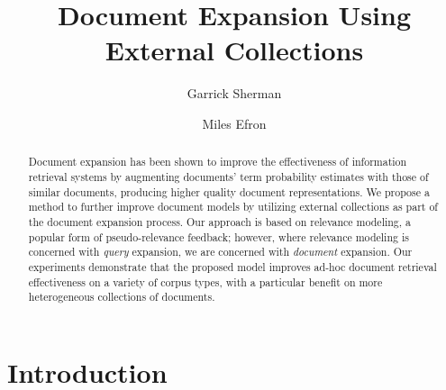 \documentclass[sigconf]{acmart}
\begin{document}
\author{Garrick Sherman}
\author{Miles Efron}


\title{Document Expansion Using External Collections}

\begin{abstract}
Document expansion has been shown to improve the effectiveness of information retrieval systems by augmenting documents' term probability estimates with those of similar documents, producing higher quality document representations. We propose a method to further improve document models by utilizing external collections as part of the document expansion process. Our approach is based on relevance modeling, a popular form of pseudo-relevance feedback; however, where relevance modeling is concerned with \textit{query} expansion, we are concerned with \textit{document} expansion. Our experiments demonstrate that the proposed model improves ad-hoc document retrieval effectiveness on a variety of corpus types, with a particular benefit on more heterogeneous collections of documents.
\end{abstract}

\maketitle

\section{Introduction}\label{section.intro}

\end{document}
